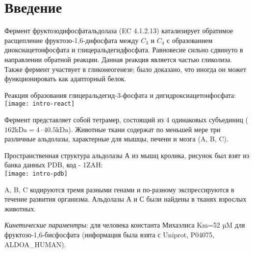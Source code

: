 \section{Введение}
Фермент фруктозодифосфатальдолаза (EC 4.1.2.13) катализирует обратимое расщепление
фруктозо-1,6-дифосфата между $C_3$ и $C_4$ с образованием диоксиацетонфосфата и глицеральдегидфосфата.
Равновесие сильно сдвинуто в направлении обратной реакции.
Данная реакция является частью гликолиза. Также фермент участвует в гликонеогенезе;
было доказано, что иногда он может функционировать как адапторный белок.

Реакция образования глицеральдегид-3-фосфата и дигидроксиацетонфосфата:\\
\texttt{[image: intro-react]}

Фермент представляет собой тетрамер, состоящий из 4 одинаковых субъединиц
($ 162 \text{kDa} = 4 \cdot 40.5 \text{kDa} $).
Животные ткани содержат по меньшей мере три различные альдолазы, характерные для
мышцы, печени и мозга (A, B, C).

Пространственная структура альдолазы А из мышц кролика, рисунок был взят из банка данных PDB, код - 1ZAH:\\
\texttt{[image: intro-pdb]}

A, B, C кодируются тремя разными генами и по-разному экспрессируются в течение развития организма.
Альдолазы А и С были найдены в тканях взрослых животных.

\emph{Кинетические параментры}: для человека константа Михаэлиса Km=52 µM для фруктозо-1,6-бисфосфата
(информация была взята с Uniprot, P04075, ALDOA\_HUMAN).

